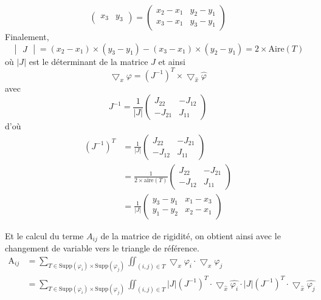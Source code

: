 \documentclass[a4paper,12pt,titlepage]{report}
\begin{document}
\begin{onehalfspace}
\begin{appendix}
\[\begin{pmatrix}
   x_{3} &  y_{3}
\end{pmatrix} =
\begin{pmatrix}
   x_{2}-x_{1} &  y_{2}-y_{1} \\
   x_{3}-x_{1} &  y_{3}-y_{1}
\end{pmatrix}
\]
Finalement,
\[
\begin{vmatrix}
   J
\end{vmatrix}
= (x_{2}-x_{1})\times (y_{3}-y_{1})-(x_{3}-x_{1})\times(y_{2}-y_{1})= 2\times\text{Aire}(T)
\]
où $|J|$ est le déterminant de la matrice $J$
et ainsi
\[ \bigtriangledown_{x} \varphi =  (J^{-1})^{T} \times \bigtriangledown_{\hat{x}} \hat{\varphi} \]
avec
\[
J^{-1} =  \frac{1}{|J|}
\begin{pmatrix}
   J_{22} & -J_{12} \\
   -J_{21} & J_{11}
\end{pmatrix}
\]
d'où
\[
\begin{aligned}
	(J^{-1})^{T} 
	&=  	
	\frac{1}{|J|}
	\begin{pmatrix}
   		J_{22} & -J_{21} \\
   		-J_{12} & J_{11}	
	\end{pmatrix} \\
	&=
	\frac{1}{2\times \text{aire}(T)}
	\begin{pmatrix}
   		J_{22} & -J_{21} \\
   		-J_{12} & J_{11}	
	\end{pmatrix}    \\
	&=
	\frac{1}{|J|}
	\begin{pmatrix}
   		y_{3}-y_{1} &  	x_{1}-x_{3}\\
   		y_{1}-y_{2} &  x_{2}-x_{1}
	\end{pmatrix}
	\end{aligned}
\]

Et le calcul du terme $A_{ij}$ de la matrice de rigidité, on obtient ainsi avec le changement de variable vers le triangle de référence.
\[
\begin{aligned}
	\text{A}_{ij} 
	&=
	\sum_{T \in \text{Supp}(\varphi_{i})\times \text{Supp}(\varphi_{j})} 
	\iint_{(i,j) \in T}\bigtriangledown_{x}{\varphi_{i}} \cdot \bigtriangledown_{x}{\varphi_{j}} \\
	&=
	\sum_{T \in \text{Supp}(\varphi_{i})\times \text{Supp}(\varphi_{j})}
	\iint_{(i,j) \in T} |J|(J^{-1})^{T}
	\cdot
	\bigtriangledown_{\hat{x}} \hat{\varphi_{i}} \cdot
	|J| (J^{-1})^{T} 
	\cdot
	\bigtriangledown_{\hat{x}} \hat{\varphi_{j}} \\
\end{aligned}
\]


\end{appendix}
\end{onehalfspace}
\end{document}
